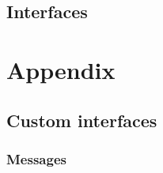 \subsection{Interfaces}



\section{Appendix}

\subsection{Custom interfaces}

\subsubsection{Messages}

